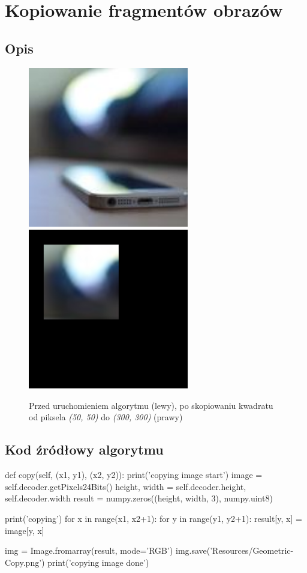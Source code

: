 \documentclass[a4paper,12pt]{book}
\begin{document}
\section{Kopiowanie fragmentów obrazów}
\subsection*{Opis}
\begin{figure}[H]
	\caption{Przed uruchomieniem algorytmu (lewy), po skopiowaniu kwadratu od piksela \textit{(50, 50)} do \textit{(300, 300)} (prawy)}
	\includegraphics[width=7cm, height=7cm]{phone-unmodified.jpg}
	\includegraphics[width=7cm, height=7cm]{phone-copy.png}
\end{figure}
\subsection*{Kod źródłowy algorytmu}
\begin{python}
def copy(self, (x1, y1), (x2, y2)):
	print('copying image start')
	image = self.decoder.getPixels24Bits()
	height, width = self.decoder.height, self.decoder.width
	result = numpy.zeros((height, width, 3), numpy.uint8)
	
	print('copying')
	for x in range(x1, x2+1):
		for y in range(y1, y2+1):
			result[y, x] = image[y, x]
	
	img = Image.fromarray(result, mode='RGB')
	img.save('Resources/Geometric-Copy.png')
	print('copying image done')
\end{python}
\end{document}
